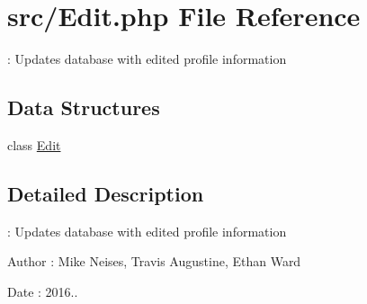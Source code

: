 \hypertarget{_edit_8php}{}\section{src/\+Edit.php File Reference}
\label{_edit_8php}


\+: Updates database with edited profile information  


\subsection*{Data Structures}
\begin{DoxyCompactItemize}
\item 
class \hyperlink{class_edit}{Edit}
\end{DoxyCompactItemize}


\subsection{Detailed Description}
\+: Updates database with edited profile information 

\begin{DoxyAuthor}{Author}
\+: Mike Neises, Travis Augustine, Ethan Ward 
\end{DoxyAuthor}
\begin{DoxyDate}{Date}
\+: 2016.. 
\end{DoxyDate}
